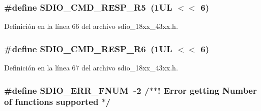 \subsubsection[{\texorpdfstring{S\+D\+I\+O\+\_\+\+C\+M\+D\+\_\+\+R\+E\+S\+P\+\_\+\+R5}{SDIO_CMD_RESP_R5}}]{\setlength{\rightskip}{0pt plus 5cm}\#define S\+D\+I\+O\+\_\+\+C\+M\+D\+\_\+\+R\+E\+S\+P\+\_\+\+R5~(1\+U\+L $<$$<$ 6)}\hypertarget{group___s_d_i_o__18_x_x__43_x_x_ga6fa4ac27f75edbdf59f840cecd675f9f}{}\label{group___s_d_i_o__18_x_x__43_x_x_ga6fa4ac27f75edbdf59f840cecd675f9f}


Definición en la línea 66 del archivo sdio\+\_\+18xx\+\_\+43xx.\+h.

\subsubsection[{\texorpdfstring{S\+D\+I\+O\+\_\+\+C\+M\+D\+\_\+\+R\+E\+S\+P\+\_\+\+R6}{SDIO_CMD_RESP_R6}}]{\setlength{\rightskip}{0pt plus 5cm}\#define S\+D\+I\+O\+\_\+\+C\+M\+D\+\_\+\+R\+E\+S\+P\+\_\+\+R6~(1\+U\+L $<$$<$ 6)}\hypertarget{group___s_d_i_o__18_x_x__43_x_x_ga935f51abdef49f44cde7c6978b829618}{}\label{group___s_d_i_o__18_x_x__43_x_x_ga935f51abdef49f44cde7c6978b829618}


Definición en la línea 67 del archivo sdio\+\_\+18xx\+\_\+43xx.\+h.

\subsubsection[{\texorpdfstring{S\+D\+I\+O\+\_\+\+E\+R\+R\+\_\+\+F\+N\+UM}{SDIO_ERR_FNUM}}]{\setlength{\rightskip}{0pt plus 5cm}\#define S\+D\+I\+O\+\_\+\+E\+R\+R\+\_\+\+F\+N\+UM~-\/2 /$\ast$$\ast$! Error getting Number of functions supported $\ast$/}\hypertarget{group___s_d_i_o__18_x_x__43_x_x_ga6f79f991e7b930ac27704feade59a3d6}{}\label{group___s_d_i_o__18_x_x__43_x_x_ga6f79f991e7b930ac27704feade59a3d6}


